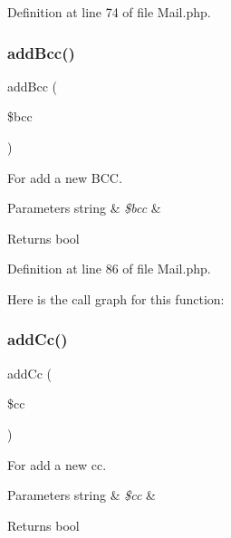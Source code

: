 Definition at line 74 of file Mail.\+php.

\mbox{\label{class_zest_1_1_mail_1_1_mail_af3caeb841610ad2fa4dcbbc4d157eee8}} 
\subsubsection{\texorpdfstring{add\+Bcc()}{addBcc()}}
{\footnotesize\ttfamily add\+Bcc (\begin{DoxyParamCaption}\item[{}]{\$bcc }\end{DoxyParamCaption})}

For add a new B\+CC.


\begin{DoxyParams}[1]{Parameters}
string & {\em \$bcc} & \\
\hline
\end{DoxyParams}
\begin{DoxyReturn}{Returns}
bool 
\end{DoxyReturn}


Definition at line 86 of file Mail.\+php.

Here is the call graph for this function\+:
\mbox{\label{class_zest_1_1_mail_1_1_mail_aa6928c70ebce7734d8b21ae2c41065da}} 
\subsubsection{\texorpdfstring{add\+Cc()}{addCc()}}
{\footnotesize\ttfamily add\+Cc (\begin{DoxyParamCaption}\item[{}]{\$cc }\end{DoxyParamCaption})}

For add a new cc.


\begin{DoxyParams}[1]{Parameters}
string & {\em \$cc} & \\
\hline
\end{DoxyParams}
\begin{DoxyReturn}{Returns}
bool 
\end{DoxyReturn}


